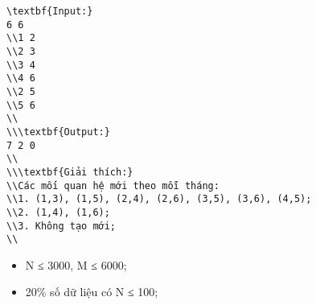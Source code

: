 \begin{verbatim}
\textbf{Input:}
6 6
\\1 2
\\2 3
\\3 4
\\4 6
\\2 5
\\5 6
\\
\\\textbf{Output:}
7 2 0
\\
\\\textbf{Giải thích:}
\\Các mối quan hệ mới theo mỗi tháng:
\\1. (1,3), (1,5), (2,4), (2,6), (3,5), (3,6), (4,5);
\\2. (1,4), (1,6);
\\3. Không tạo mới;
\\\end{verbatim}
\begin{itemize}
	\item     N ≤ 3000, M ≤ 6000;   
	\item     20\% số dữ liệu có N ≤ 100;   
\end{itemize}